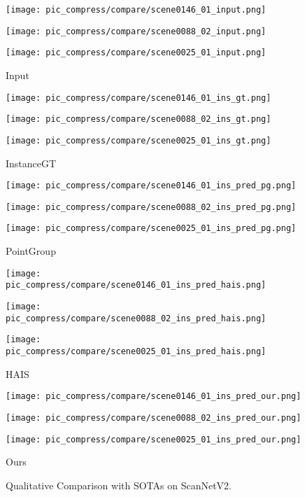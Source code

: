 \documentclass[10pt,twocolumn,letterpaper]{article}
\begin{document}
\begin{figure*}[h]
	\centering 
	\begin{minipage}{0.18\linewidth}
		\centerline{\texttt{[image:  pic\_compress/compare/scene0146\_01\_input.png]}}
		\centerline{\texttt{[image:  pic\_compress/compare/scene0088\_02\_input.png]}} 
		\centerline{\texttt{[image:  pic\_compress/compare/scene0025\_01\_input.png]}}
		\centerline{Input}
	\end{minipage}
	\begin{minipage}{0.18\linewidth} 
		\centerline{\texttt{[image:  pic\_compress/compare/scene0146\_01\_ins\_gt.png]}}
		\centerline{\texttt{[image:  pic\_compress/compare/scene0088\_02\_ins\_gt.png]}}
		\centerline{\texttt{[image:  pic\_compress/compare/scene0025\_01\_ins\_gt.png]}}
		\centerline{Instance\quad GT}
	\end{minipage}
	\begin{minipage}{0.18\linewidth}
\centerline{\texttt{[image:  pic\_compress/compare/scene0146\_01\_ins\_pred\_pg.png]}}
		\centerline{\texttt{[image:  pic\_compress/compare/scene0088\_02\_ins\_pred\_pg.png]}}
		\centerline{\texttt{[image:  pic\_compress/compare/scene0025\_01\_ins\_pred\_pg.png]}}
		\centerline{PointGroup~\cite{jiang2020pointgroup} }
	\end{minipage}
	\begin{minipage}{0.18\linewidth}
\centerline{\texttt{[image:  pic\_compress/compare/scene0146\_01\_ins\_pred\_hais.png]}}
		\centerline{\texttt{[image:  pic\_compress/compare/scene0088\_02\_ins\_pred\_hais.png]}}
		\centerline{\texttt{[image:  pic\_compress/compare/scene0025\_01\_ins\_pred\_hais.png]}}
		\centerline{HAIS~\cite{chen2021hierarchical} }
	\end{minipage}
	\begin{minipage}{0.18\linewidth}
\centerline{\texttt{[image:  pic\_compress/compare/scene0146\_01\_ins\_pred\_our.png]}}
		\centerline{\texttt{[image:  pic\_compress/compare/scene0088\_02\_ins\_pred\_our.png]}} 
		\centerline{\texttt{[image:  pic\_compress/compare/scene0025\_01\_ins\_pred\_our.png]}}
		\centerline{Ours }
	\end{minipage}
	\caption{Qualitative Comparison with SOTAs on ScanNetV2. }
	\label{fig:com_pic_sota}
\end{figure*}
\end{document}
